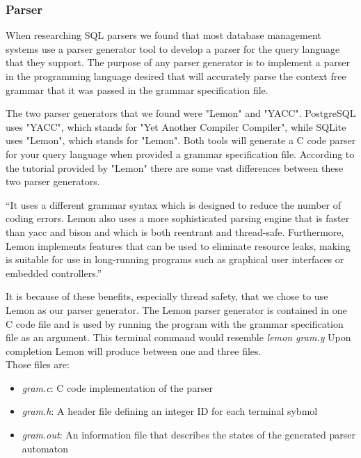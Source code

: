 \documentclass[letterpaper, 12pt]{article}
\begin{document}
\subsubsection{Parser}
When researching SQL parsers we found that most database management systems use a
parser generator tool to develop a parser for the query language that they support.
The purpose of any parser generator is to implement a parser in the programming
language desired that will accurately parse the context free grammar that it 
was passed in the grammar specification file.
\par\vspace{\baselineskip}
The two parser generators that we found were "Lemon" and "YACC". PostgreSQL uses 
"YACC", which stands for "Yet Another Compiler Compiler", while SQLite uses 
"Lemon", which stands for "Lemon". Both tools will generate a C code parser for 
your query language when provided a grammar specification file. According to the 
tutorial provided by "Lemon" there are some vast differences between these 
two parser generators. 
\par\vspace{\baselineskip}
“It uses a different grammar syntax which is designed to reduce the number of coding
errors. Lemon also uses a more sophisticated parsing engine that is faster than yacc and
bison and which is both reentrant and thread-safe. Furthermore, Lemon implements features
that can be used to eliminate resource leaks, making is suitable for use in long-running
programs such as graphical user interfaces or embedded controllers.”\cite{lemon_parser}
\par\vspace{\baselineskip}
It is because of these benefits, especially thread safety, that we chose to use Lemon
as our parser generator. The Lemon parser generator is contained in one C code file and
is used by running the program with the grammar specification file as an argument.
This terminal command would resemble \textit{lemon gram.y} 
Upon completion Lemon will produce between one and three files.\\ Those files are:
\begin{itemize}
	\item \textit{gram.c}: C code implementation of the parser
	\item \textit{gram.h}: A header file defining an integer ID for each terminal sybmol
	\item \textit{gram.out}: An information file that describes the states of the
	generated parser automaton
\end{itemize}
\end{document}
